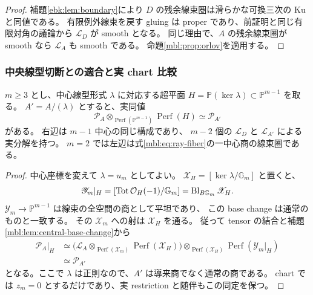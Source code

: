 \begin{proof}
補題\ref{ebk:lem:boundary}により $D$ の残余線束圏は滑らかな可換三次の Ku と同値である。
有限例外線束を戻す gluing は proper であり、前証明と同じ有限対角の議論から
$\mathcal L_D$ が smooth となる。
同じ理由で、$A$ の残余線束圏が smooth なら $\mathcal L_A$ も smooth である。
命題\ref{mbl:prop:orlov}を適用する。
\end{proof}

\subsubsection{中央線型切断との適合と実 chart 比較}

\begin{lemma}
\label{mbl:lem:linear-section}
$m\ge3$ とし、中心線型形式 $\lambda$ に対応する超平面
$H=\mathbb P(\ker\lambda)\subset\mathbb P^{m-1}$ を取る。
$A'=A/(\lambda)$ とすると、実同値
\begin{equation}\label{mbl:eq:linear-section}
        \mathcal P_A\otimes_{\operatorname{Perf}(\mathbb P^{m-1})}
                       \operatorname{Perf}(H)
              \simeq\mathcal P_{A'}
\end{equation}
がある。
右辺は $m-1$ 中心の同じ構成であり、
$m-2$ 個の $\mathcal L_D$ と $\mathcal L_{A'}$ による実分解を持つ。
$m=2$ では左辺は式\eqref{mbl:eq:ray-fiber}の一中心商の線束圏である。
\end{lemma}

\begin{proof}
中心座標を変えて $\lambda=u_m$ としてよい。
$\mathscr X_H=[\ker\lambda/\mathbb G_m]$ と置くと、
\[
 \mathscr Y_m|_H=[\operatorname{Tot}\mathcal O_H(-1)/\mathbb G_m]
               =\operatorname{Bl}_{B\mathbb G_m}\mathscr X_H.
\]
$\mathscr Y_m\to\mathbb P^{m-1}$ は線束の全空間の商として平坦であり、
この base change は通常のものと一致する。
その $\mathscr X_m$ への射は $\mathscr X_H$ を通る。
従って tensor の結合と補題\ref{mbl:lem:central-base-change}から
\[
 \begin{split}
 \mathcal P_A|_H
  &\simeq
  \bigl(\mathcal L_A\otimes_{\operatorname{Perf}(\mathscr X_m)}
                      \operatorname{Perf}(\mathscr X_H)\bigr)
          \otimes_{\operatorname{Perf}(\mathscr X_H)}
                      \operatorname{Perf}(\mathscr Y_m|_H)\\
  &\simeq\mathcal P_{A'}
 \end{split}
\]
となる。ここで $\lambda$ は正則なので、$A'$ は導来商でなく通常の商である。
chart では $z_m=0$ とするだけであり、実 restriction と随伴もこの同定を保つ。
\end{proof}

